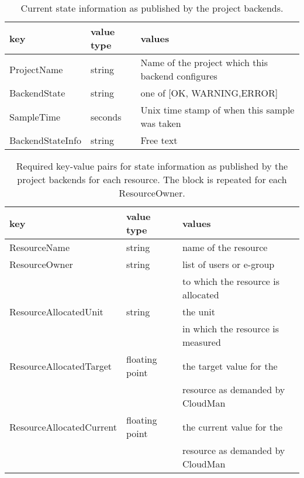 
\begin{table}[bh]
\begin{center}
\begin{tabular}{|l|l|l|}
\hline
key& value type & values \\
\hline
\hline
ProjectName  & string &  Name of the project which this backend configures\\
BackendState & string &  one of [OK, WARNING,ERROR] \\
SampleTime   & seconds & Unix time stamp of when this sample was taken \\
BackendStateInfo& string & Free text \\
\hline
\end{tabular}
\end{center}
\caption{\label{stateinfo}Current state information as published by the project backends.}
\end{table}

\begin{table}[bh]
\begin{center}
\begin{tabular}{|l|l|l|}
\hline
key & value type & values \\
\hline
\hline
ResourceName& string & name of the resource \\
ResourceOwner& string & list of users or e-group\\
             &        &   to which the resource is allocated \\
ResourceAllocatedUnit & string & the unit \\
& & in which the resource is measured \\
ResourceAllocatedTarget & floating point & the target value for the \\
& & resource as demanded by CloudMan \\
ResourceAllocatedCurrent & floating point & the current value for the \\
& & resource as demanded by CloudMan \\
\hline
\end{tabular}
\end{center}
\caption{\label{resourceinfo} Required key-value pairs for state information as published by the project backends for each resource. The block is repeated for each ResourceOwner.}
\end{table}

